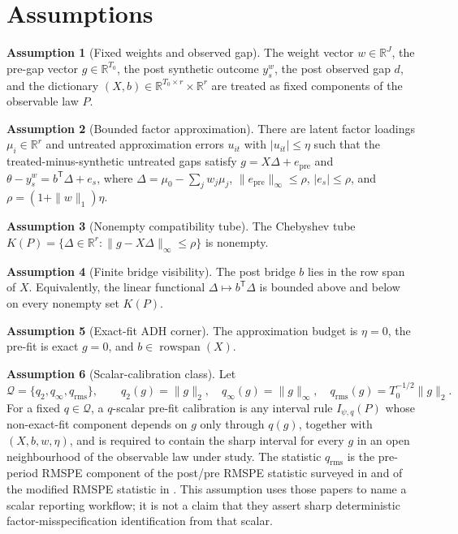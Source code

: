 \documentclass[11pt]{article}
\newcommand{\transpose}{\mathsf{T}}
\newcommand{\R}{\mathbb{R}}
\theoremstyle{definition}
\newtheorem{assumption}{Assumption}
\theoremstyle{plain}
\theoremstyle{remark}
\begin{document}
\section{Assumptions}
\begin{assumption}[Fixed weights and observed gap]\label{ass:fixed-weights}
The weight vector \(w\in\R^J\), the pre-gap vector \(g\in\R^{T_0}\), the post synthetic outcome \(y_s^w\), the post observed gap \(d\), and the dictionary \((X,b)\in\R^{T_0\times r}\times\R^r\) are treated as fixed components of the observable law \(P\).
\end{assumption}

\begin{assumption}[Bounded factor approximation]\label{ass:bounded-factor}
There are latent factor loadings \(\mu_i\in\R^r\) and untreated approximation errors \(u_{it}\) with \(|u_{it}|\le\eta\) such that the treated-minus-synthetic untreated gaps satisfy \(g=X\Delta+e_{\mathrm{pre}}\) and \(\theta-y_s^w=b^\transpose\Delta+e_s\), where \(\Delta=\mu_0-\sum_jw_j\mu_j\), \(\|e_{\mathrm{pre}}\|_\infty\le\rho\), \(|e_s|\le\rho\), and \(\rho=(1+\|w\|_1)\eta\).
\end{assumption}

\begin{assumption}[Nonempty compatibility tube]\label{ass:nonempty}
The Chebyshev tube \(K(P)=\{\Delta\in\R^r:\|g-X\Delta\|_\infty\le\rho\}\) is nonempty.
\end{assumption}

\begin{assumption}[Finite bridge visibility]\label{ass:bridge-visible}
The post bridge \(b\) lies in the row span of \(X\). Equivalently, the linear functional \(\Delta\mapsto b^\transpose\Delta\) is bounded above and below on every nonempty set \(K(P)\).
\end{assumption}

\begin{assumption}[Exact-fit ADH corner]\label{ass:exact-corner}
The approximation budget is \(\eta=0\), the pre-fit is exact \(g=0\), and \(b\in\operatorname{rowspan}(X)\).
\end{assumption}

\begin{assumption}[Scalar-calibration class]\label{ass:scalar-class}
Let
\[
 \mathcal Q=\{q_2,q_\infty,q_{\mathrm{rms}}\},\qquad
 q_2(g)=\|g\|_2,\quad q_\infty(g)=\|g\|_\infty,\quad
 q_{\mathrm{rms}}(g)=T_0^{-1/2}\|g\|_2 .
\]
For a fixed \(q\in\mathcal Q\), a \(q\)-scalar pre-fit calibration is any interval rule \(I_{\psi,q}(P)\) whose non-exact-fit component depends on \(g\) only through \(q(g)\), together with \((X,b,w,\eta)\), and is required to contain the sharp interval for every \(g\) in an open neighbourhood of the observable law under study. The statistic \(q_{\mathrm{rms}}\) is the pre-period RMSPE component of the post/pre RMSPE statistic surveyed in \citet{Abadie2021} and of the modified RMSPE statistic in \citet{FirpoPossebom2018}. This assumption uses those papers to name a scalar reporting workflow; it is not a claim that they assert sharp deterministic factor-misspecification identification from that scalar.
\end{assumption}
\end{document}
